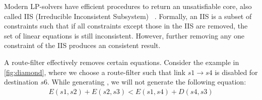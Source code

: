 Modern LP-solvers have efficient procedures to return an
unsatisfiable core, also called IIS (Irreducible Inconsistent Subsystem)
~\cite{iis}. Formally, an IIS is a subset of constraints such that
if all constraints except those in the IIS are removed, the set of
linear equations is still inconsistent. However, further removing 
any one constraint of the IIS produces an consistent result. 

A route-filter effectively removes certain equations. 
Consider the example in \cref{fig:diamond}, where we choose
a route-filter such that link $s1 \rightarrow s4$ is disabled for
destination $s6$. While generating , we will not
generate the following equation: 
\begin{eqnarray}
E(s1, s2) + E(s2, s3) < E(s1, s4) + D(s4, s3) \nonumber
\end{eqnarray} 